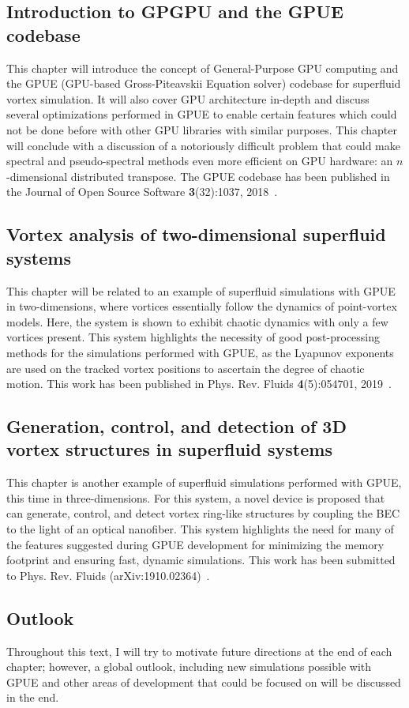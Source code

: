 \subsection*{Introduction to GPGPU and the GPUE codebase}

This chapter will introduce the concept of General-Purpose GPU computing and the GPUE (GPU-based Gross-Piteavskii Equation solver) codebase for superfluid vortex simulation.
It will also cover GPU architecture in-depth and discuss several optimizations performed in GPUE to enable certain features which could not be done before with other GPU libraries with similar purposes.
This chapter will conclude with a discussion of a notoriously difficult problem that could make spectral and pseudo-spectral methods even more efficient on GPU hardware: an $n$-dimensional distributed transpose.
The GPUE codebase has been published in the Journal of Open Source Software \textbf{3}(32):1037, 2018~\cite{schloss2018}.

\subsection*{Vortex analysis of two-dimensional superfluid systems}

This chapter will be related to an example of superfluid simulations with GPUE in two-dimensions, where vortices essentially follow the dynamics of point-vortex models.
Here, the system is shown to exhibit chaotic dynamics with only a few vortices present.
This system highlights the necessity of good post-processing methods for the simulations performed with GPUE, as the Lyapunov exponents are used on the tracked vortex positions to ascertain the degree of chaotic motion.
This work has been published in Phys. Rev. Fluids \textbf{4}(5):054701, 2019~\cite{zhang2019}.

\subsection*{Generation, control, and detection of 3D vortex structures in superfluid systems}

This chapter is another example of superfluid simulations performed with GPUE, this time in three-dimensions.
For this system, a novel device is proposed that can generate, control, and detect vortex ring-like structures by coupling the BEC to the light of an optical nanofiber.
This system highlights the need for many of the features suggested during GPUE development for minimizing the memory footprint and ensuring fast, dynamic simulations.
This work has been submitted to Phys. Rev. Fluids (arXiv:1910.02364)~\cite{schloss2019}.

\subsection*{Outlook}
Throughout this text, I will try to motivate future directions at the end of each chapter; however, a global outlook, including new simulations possible with GPUE and other areas of development that could be focused on will be discussed in the end.
